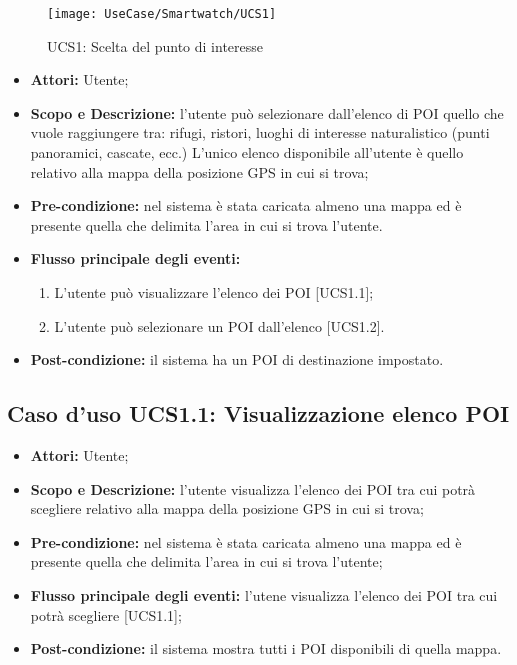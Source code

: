 \begin{figure}[H]
\centering
\texttt{[image: UseCase/Smartwatch/UCS1]}
\caption{UCS1: Scelta del punto di interesse}
\end{figure}

\begin{itemize}
\item \textbf{Attori:} Utente;
\item \textbf{Scopo e Descrizione:} l'utente può selezionare dall'elenco di POI quello che vuole raggiungere tra: rifugi, ristori, luoghi di interesse naturalistico (punti panoramici, cascate, ecc.) L'unico elenco disponibile all'utente è quello relativo alla mappa della posizione GPS in cui si trova; 
\item \textbf{Pre-condizione:} nel sistema è stata caricata almeno una mappa ed è presente quella che delimita l'area in cui si trova l'utente.
\item \textbf{Flusso principale degli eventi:}
\begin{enumerate}
\item L'utente può visualizzare l'elenco dei POI [UCS1.1];
\item L'utente può selezionare un POI dall'elenco [UCS1.2].
\end{enumerate}
\item \textbf{Post-condizione:} il sistema ha un POI di destinazione impostato.
\end{itemize}


\subsection{Caso d'uso UCS1.1: Visualizzazione elenco POI}
\begin{itemize}
\item \textbf{Attori:} Utente;
\item \textbf{Scopo e Descrizione:} l’utente visualizza l’elenco dei POI tra cui potrà scegliere relativo alla mappa della posizione GPS in cui si trova;
\item \textbf{Pre-condizione:} nel sistema è stata caricata almeno una mappa ed è presente quella che delimita l'area in cui si trova l'utente;
\item \textbf{Flusso principale degli eventi:} l'utene visualizza l'elenco dei POI tra cui potrà scegliere [UCS1.1];
\item \textbf{Post-condizione:} il sistema mostra tutti i POI disponibili di quella mappa. 
\end{itemize}

